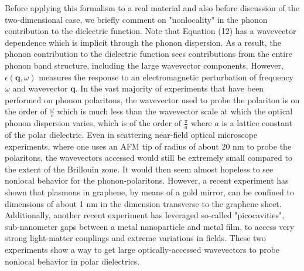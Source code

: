 \documentclass[superscriptaddress,reprint,prb]{revtex4-1}
\begin{document}
Before applying this formalism to a real material and also before discussion of the two-dimensional case, we briefly comment on "nonlocality" in the phonon contribution to the dielectric function. Note that Equation (12) has a wavevector dependence which is implicit through the phonon dispersion. As a result, the phonon contribution to the dielectric function sees contributions from the entire phonon band structure, including the large wavevector components. However, $\epsilon(\mathbf{q},\omega)$ measures the response to an electromagnetic perturbation of frequency $\omega$ and wavevector $\mathbf{q}$. In the vast majority of experiments that have been performed on phonon polaritons, the wavevector used to probe the polariton is on the order of $\frac{\omega}{c}$ which is much less than the wavevector scale at which the optical phonon dispersion varies, which is of the order of $\frac{\pi}{a}$ where $a$ is a lattice constant of the polar dielectric.  Even in scattering near-field optical microscope experiments, where one uses an AFM tip of radius of about $20$ nm to probe the polaritons, the wavevectors accessed would still be extremely small compared to the extent of the Brillouin zone. It would then seem almost hopeless to see nonlocal behavior for the phonon-polaritons. However, a recent experiment \cite{iranzo2018probing} has shown that plasmons in graphene, by means of a gold mirror, can be confined to dimensions of about 1 nm in the dimension transverse to the graphene sheet. Additionally, another recent experiment \cite{benz2016single} has leveraged so-called "picocavities", sub-nanometer gaps between a metal nanoparticle and metal film, to access very strong light-matter couplings and extreme variations in fields. These two experiments show a way to get large optically-accessed wavevectors to probe nonlocal behavior in polar dielectrics.
\end{document}
